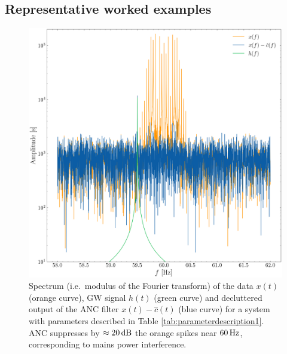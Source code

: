 \documentclass[pra,superscriptaddress,reprint,amsmath,amssymb,nofootinbib]{revtex4-2}
\begin{document}
\subsection{Representative worked examples} \label{sec:representative_example}
\begin{figure}
	\begin{center}
		\includegraphics[width=\columnwidth]{images/spectrum.png}
	\end{center}
	\caption{Spectrum (i.e.\ modulus of the Fourier transform) of the data $x(t)$ (orange curve), GW signal $h(t)$ (green curve) and decluttered output of the ANC filter $x(t) - \hat{c}(t)$ (blue curve) for a system with parameters described in Table \ref{tab:parameterdescription1}. ANC suppresses by $\approx 20\, {\rm dB}$ the orange spikes near $60 \, {\rm Hz}$, corresponding to mains power interference.}
	\label{fig:spectrum}
\end{figure}
\end{document}
